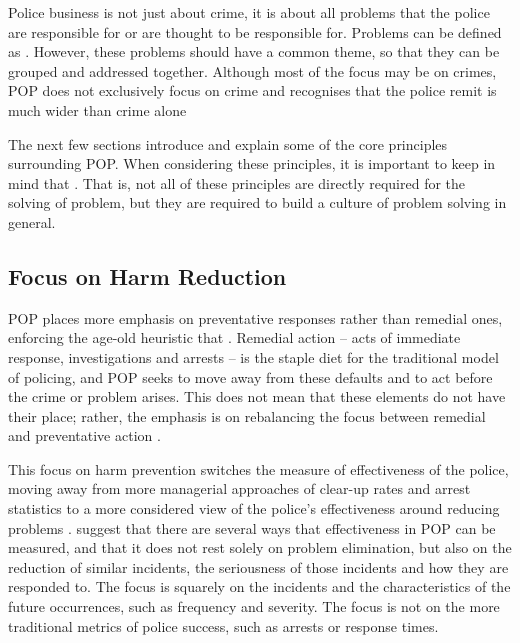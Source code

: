 Police business is not just about crime, it is about all problems that the police are responsible for or are thought to be responsible for. Problems can be defined as   \parencite{popchap11}. However, these problems should have a common theme, so that they can be grouped and addressed together. Although most of the focus may be on crimes, POP does not exclusively focus on crime and recognises that the police remit is much wider than crime alone

The next few sections introduce and explain some of the core principles surrounding POP. When considering these principles, it is important to keep in mind that  \parencite{scott2020problem}. That is, not all of these principles are directly required for the solving of  problem, but they are required to build a culture of problem solving in general.

\subsection{Focus on Harm Reduction}POP places more emphasis on preventative responses rather than remedial ones, enforcing the age-old heuristic that  . Remedial action – acts of immediate response, investigations and arrests – is the staple diet for the traditional model of policing, and POP seeks to move away from these defaults and to act before the crime or problem arises. This does not mean that these elements do not have their place; rather, the emphasis is on rebalancing the focus between remedial and preventative action \parencite{goldstein1990}. 

This focus on harm prevention switches the measure of effectiveness of the police, moving away from more managerial approaches of clear-up rates and arrest statistics to a more considered view of the police’s effectiveness around reducing problems \parencite{goldstein1990}.  \textcite{eck1987problem} suggest that there are several ways that effectiveness in POP can be measured, and that it does not rest solely on problem elimination, but also on the reduction of similar incidents, the seriousness of those incidents and how they are responded to. The focus is squarely on the incidents and the characteristics of the future occurrences, such as frequency and severity. The focus is not on the more traditional metrics of police success, such as arrests or response times.

